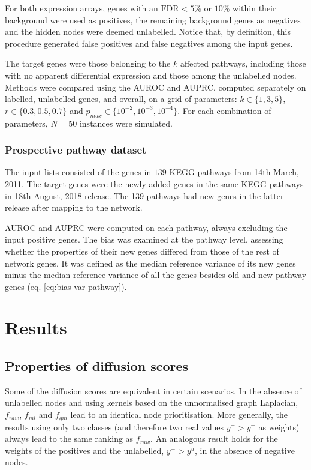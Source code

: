 \documentclass[final]{bioinfo}
\begin{document}
\begin{methods}
For both expression arrays, genes with an $ \textrm{FDR}<5\%$ or $10\% $ within their background were used as positives, the remaining background genes as negatives and the hidden nodes were deemed unlabelled. 
Notice that, by definition, this procedure generated false positives and false negatives among the input genes. 

The target genes were those belonging to the $k$ affected pathways, including those with no apparent differential expression and those among the unlabelled nodes.
Methods were compared using the AUROC and AUPRC, computed separately on labelled, unlabelled genes, and overall, on a grid of parameters: $k \in \{1,3,5\}$, $r \in \{0.3,0.5,0.7\}$ and $p_{max} \in \{10^{-2},10^{-3},10^{-4}\}$. 
For each combination of parameters, $N = 50$ instances were simulated.

\subsubsection*{Prospective pathway dataset}

The input lists consisted of the genes in $139$ KEGG pathways from 14th March, 2011. 
The target genes were the newly added genes in the same KEGG pathways in 18th August, 2018 release.
The 139 pathways had new genes in the latter release after mapping to the network. 

AUROC and AUPRC were computed on each pathway, always excluding the input positive genes. 
The bias was examined at the pathway level, assessing whether the properties of their new genes differed from those of the rest of network genes. 
It was defined as the median reference variance of its new genes minus the median reference variance of all the genes besides old and new pathway genes (eq. \ref{eq:bias-var-pathway}). 

\end{methods}

\section{Results}

\subsection*{Properties of diffusion scores}

Some of the diffusion scores are equivalent in certain scenarios. 
In the absence of unlabelled nodes and using kernels based on the unnormalised graph Laplacian, $f_{raw}$, $f_{ml}$ and $f_{gm}$ lead to an identical node prioritisation. 
More generally, the results using only two classes (and therefore two real values $y^+ > y^-$ as weights) always lead to the same ranking as $f_{raw}$. 
An analogous result holds for the weights of the positives and the unlabelled, $y^+ > y^u$, in the absence of negative nodes. 
\end{document}
